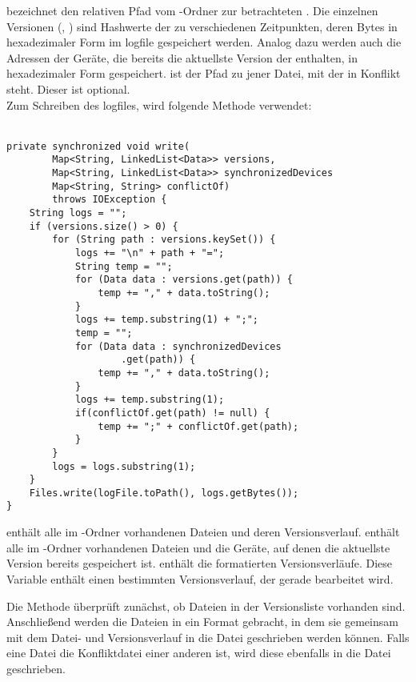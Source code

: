  bezeichnet den relativen Pfad vom \sblit-Ordner zur betrachteten . Die einzelnen Versionen (, ) sind Hashwerte der  zu verschiedenen Zeitpunkten, deren Bytes in hexadezimaler Form im \gls{logfile} gespeichert werden. Analog dazu werden auch die Adressen der Geräte, die bereits die aktuellste Version der  enthalten, in hexadezimaler Form gespeichert.  ist der Pfad zu jener Datei, mit der  in Konflikt steht. Dieser ist optional.\\
Zum Schreiben des \gls{logfile}s, wird folgende Methode verwendet: \\ \\
\javalisting
\begin{minipage}{\linewidth}
\begin{lstlisting}[caption={Schreiben des Logfiles \datei{logs.txt}},captionpos=b]
private synchronized void write(
		Map<String, LinkedList<Data>> versions,
		Map<String, LinkedList<Data>> synchronizedDevices
		Map<String, String> conflictOf)
		throws IOException {
	String logs = "";
	if (versions.size() > 0) {
		for (String path : versions.keySet()) {
			logs += "\n" + path + "=";
			String temp = "";
			for (Data data : versions.get(path)) {
				temp += "," + data.toString();
			}
			logs += temp.substring(1) + ";";
			temp = "";
			for (Data data : synchronizedDevices
					.get(path)) {
				temp += "," + data.toString();
			}
			logs += temp.substring(1);
			if(conflictOf.get(path) != null) {
				temp += ";" + conflictOf.get(path);
			}
		}
		logs = logs.substring(1);
	}
	Files.write(logFile.toPath(), logs.getBytes());
}
\end{lstlisting}
\end{minipage}
\begin{description}
	 enthält alle im \sblit-Ordner vorhandenen Dateien und deren Versionsverlauf.
	 enthält alle im \sblit-Ordner vorhandenen Dateien und die Geräte, auf denen die aktuellste Version bereits gespeichert ist.
	 enthält die formatierten Versionsverläufe.
	Diese Variable enthält einen bestimmten Versionsverlauf, der gerade bearbeitet wird.
\end{description}
Die Methode  überprüft zunächst, ob Dateien in der Versionsliste  vorhanden sind. Anschließend werden die Dateien in ein Format gebracht, in dem sie gemeinsam mit dem Datei- und Versionsverlauf in die Datei geschrieben werden können. Falls eine Datei die Konfliktdatei einer anderen ist, wird diese ebenfalls in die Datei geschrieben.

